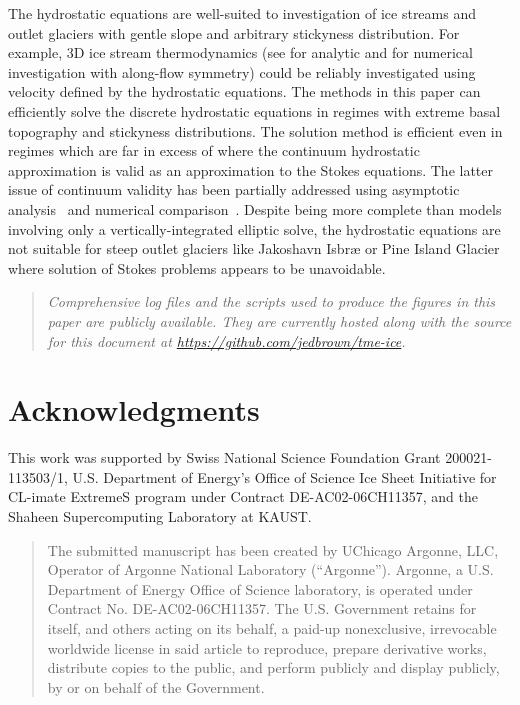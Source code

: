 \documentclass[final]{siamltex}
\newcommand{\citep}[1]{{\cite{#1}}}
\begin{document}
The hydrostatic equations are well-suited to investigation of ice streams and outlet glaciers with gentle slope and arbitrary stickyness distribution.
For example, 3D ice stream thermodynamics (see \cite{raymond2000energy} for analytic and \cite{truffer2003isbrae} for numerical investigation with along-flow symmetry) could be reliably investigated using velocity defined by the hydrostatic equations.
The methods in this paper can efficiently solve the discrete hydrostatic equations in regimes with extreme basal topography and stickyness distributions.
The solution method is efficient even in regimes which are far in excess of where the continuum hydrostatic approximation is valid as an approximation to the Stokes equations.
The latter issue of continuum validity has been partially addressed using asymptotic analysis~\citep{schoof2010thin} and numerical comparison~\citep{hindmarsh2004numerical,pattyn2008beh}.
Despite being more complete than models involving only a vertically-integrated elliptic solve, the hydrostatic equations are not suitable for steep outlet glaciers like Jakoshavn Isbr{\ae} or Pine Island Glacier where solution of Stokes problems appears to be unavoidable.

\begin{quotation}\it
  Comprehensive log files and the scripts used to produce the figures in this paper are publicly available.
  They are currently hosted along with the source for this document at \url{https://github.com/jedbrown/tme-ice}.
\end{quotation}

\section*{Acknowledgments}
This work was supported by Swiss National Science Foundation Grant 200021-113503/1, U.S. Department of Energy's Office of Science Ice Sheet Initiative for CL-imate ExtremeS program under Contract DE-AC02-06CH11357, and the Shaheen Supercomputing Laboratory at KAUST.




\bigskip
\begin{quotation}
The submitted manuscript has been created by UChicago Argonne, LLC,
Operator of Argonne National Laboratory (``Argonne'').  Argonne, a
U.S. Department of Energy Office of Science laboratory, is operated
under Contract No. DE-AC02-06CH11357.  The U.S. Government retains for
itself, and others acting on its behalf, a paid-up nonexclusive,
irrevocable worldwide license in said article to reproduce, prepare
derivative works, distribute copies to the public, and perform
publicly and display publicly, by or on behalf of the Government.
\end{quotation}
\end{document}
